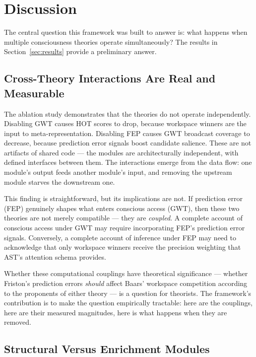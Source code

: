 \section{Discussion}
\label{sec:discussion}

The central question this framework was built to answer is: what happens when multiple consciousness theories operate simultaneously? The results in Section~\ref{sec:results} provide a preliminary answer.

\subsection{Cross-Theory Interactions Are Real and Measurable}

The ablation study demonstrates that the theories do not operate independently. Disabling GWT causes HOT scores to drop, because workspace winners are the input to meta-representation. Disabling FEP causes GWT broadcast coverage to decrease, because prediction error signals boost candidate salience. These are not artifacts of shared code --- the modules are architecturally independent, with defined interfaces between them. The interactions emerge from the data flow: one module's output feeds another module's input, and removing the upstream module starves the downstream one.

This finding is straightforward, but its implications are not. If prediction error (FEP) genuinely shapes what enters conscious access (GWT), then these two theories are not merely compatible --- they are \textit{coupled}. A complete account of conscious access under GWT may require incorporating FEP's prediction error signals. Conversely, a complete account of inference under FEP may need to acknowledge that only workspace winners receive the precision weighting that AST's attention schema provides.

Whether these computational couplings have theoretical significance --- whether Friston's prediction errors \textit{should} affect Baars' workspace competition according to the proponents of either theory --- is a question for theorists. The framework's contribution is to make the question empirically tractable: here are the couplings, here are their measured magnitudes, here is what happens when they are removed.

\subsection{Structural Versus Enrichment Modules}

